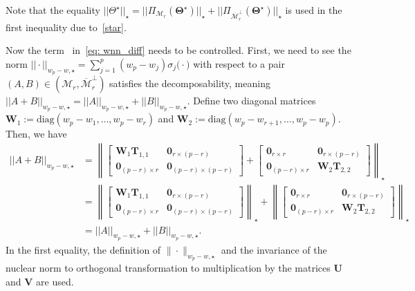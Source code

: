 \documentclass[12pt]{article}
\newcommand{\RN}[1]{%
  \textup{\uppercase\expandafter{\romannumeral#1}}%
}
\begin{document}
Note that the equality $||\Theta^\star||_{\star}=||\Pi_{\mathcal{M}_{r}}(\boldsymbol{\Theta^{\star}})||_{\star} + ||\Pi_{\overline{\mathcal{M}}_{r}^{\perp}}(\boldsymbol{\Theta^{\star}})||_{\star}$ is used in the first inequality due to~\eqref{star}.

Now the term~\RN{2} in~\eqref{eq: wnn_diff} needs to be controlled.
First, we need to see the norm $ ||\cdot||_{w_{p} - w, \star} = \sum^{p}_{j = 1} (w_{p}-w_{j}) \sigma_{j}\big(\cdot\big)$ with respect to a pair $(A,B)\in(\mathcal{M}_{r},\overline{\mathcal{M}}_{r}^{\perp})$ satisfies the decomposability, meaning $
||A+B||_{w_{p} - w, \star}=||A||_{w_{p} - w, \star}+||B||_{w_{p} - w, \star}$.
Define two diagonal matrices $\boldsymbol{W}_{1}:=\text{diag}(w_{p}-w_{1},\dots,w_{p}-w_{r})$ and $\boldsymbol{W}_{2}:=\text{diag}(w_{p}-w_{r+1},\dots,w_{p}-w_{p})$.
Then, we have 
\begin{align*}
    ||A+B||_{w_{p} - w, \star}
    &= \left\| \begin{bmatrix}
        \boldsymbol{W}_{1}\boldsymbol{T}_{1,1} & \boldsymbol{0}_{r\times (p-r)} \\
        \boldsymbol{0}_{(p-r) \times r} & \boldsymbol{0}_{(p-r) \times (p-r)} 
    \end{bmatrix} + 
    \begin{bmatrix}
        \boldsymbol{0}_{r \times r} & \boldsymbol{0}_{r\times (p-r)} \\
        \boldsymbol{0}_{(p-r) \times r} & \boldsymbol{W}_{2}\boldsymbol{T}_{2,2}
    \end{bmatrix}
    \right\|_{\star}\\
    &= \left\| \begin{bmatrix}
        \boldsymbol{W}_{1}\boldsymbol{T}_{1,1} & \boldsymbol{0}_{r\times (p-r)} \\
        \boldsymbol{0}_{(p-r) \times r} & \boldsymbol{0}_{(p-r) \times (p-r)} 
    \end{bmatrix}  \right\|_{\star} 
    + \left\|\begin{bmatrix}
        \boldsymbol{0}_{r \times r} & \boldsymbol{0}_{r\times (p-r)} \\
        \boldsymbol{0}_{(p-r) \times r} & \boldsymbol{W}_{2}\boldsymbol{T}_{2,2}
    \end{bmatrix}\right\|_{\star} \\
    &= ||A||_{w_{p} - w, \star}+||B||_{w_{p} - w, \star}.
\end{align*}
In the first equality, the definition of $\|\cdot\|_{w_{p} - w, \star}$ and the invariance of the nuclear norm to orthogonal transformation to multiplication by the matrices $\boldsymbol{U}$ and $\boldsymbol{V}$ are used. 
\end{document}
